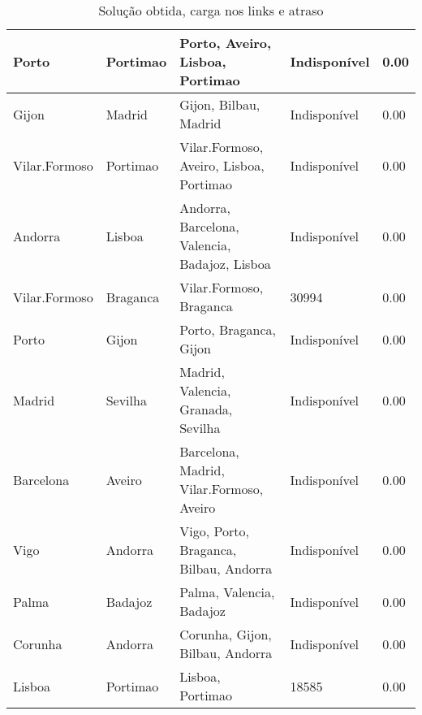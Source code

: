 \begin{table}[!htb]
{\begin{tabular}{|l|l|l|l|l|}
Porto & Portimao & Porto, Aveiro, Lisboa, Portimao & Indisponível & 0.00 \\ \hline
Gijon & Madrid & Gijon, Bilbau, Madrid & Indisponível & 0.00 \\ \hline
Vilar.Formoso & Portimao & Vilar.Formoso, Aveiro, Lisboa, Portimao & Indisponível & 0.00 \\ \hline
Andorra & Lisboa & Andorra, Barcelona, Valencia, Badajoz, Lisboa & Indisponível & 0.00 \\ \hline
Vilar.Formoso & Braganca & Vilar.Formoso, Braganca & 30994 & 0.00 \\ \hline
Porto & Gijon & Porto, Braganca, Gijon & Indisponível & 0.00 \\ \hline
Madrid & Sevilha & Madrid, Valencia, Granada, Sevilha & Indisponível & 0.00 \\ \hline
Barcelona & Aveiro & Barcelona, Madrid, Vilar.Formoso, Aveiro & Indisponível & 0.00 \\ \hline
Vigo & Andorra & Vigo, Porto, Braganca, Bilbau, Andorra & Indisponível & 0.00 \\ \hline
Palma & Badajoz & Palma, Valencia, Badajoz & Indisponível & 0.00 \\ \hline
Corunha & Andorra & Corunha, Gijon, Bilbau, Andorra & Indisponível & 0.00 \\ \hline
Lisboa & Portimao & Lisboa, Portimao & 18585 & 0.00 \\ \hline
\end{tabular}}
\caption[]{Solução obtida, carga nos links e atraso}
\end{table}

